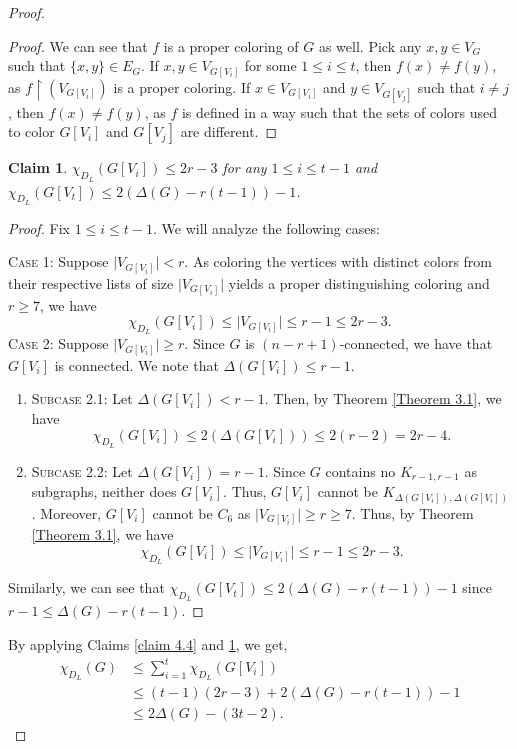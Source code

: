 \documentclass[12pt,reqno,a4paper]{amsart}
\theoremstyle{definition}
\newtheorem{claim}[defn]{Claim}
\begin{document}
\begin{proof}
\begin{proof}
We can see that $f$ is a proper coloring of $G$ as well. Pick any $x,y\in V_{G}$ such that $\{x,y\}\in E_{G}$. If $x,y\in V_{G[V_{i}]}$ for some $1\leq i\leq t$, then $f(x)\neq f(y)$, as $f\restriction (V_{G[V_{i}]})$ is a proper coloring. If $x\in V_{G[V_{i}]}$ and $y\in V_{G[V_{j}]}$ such that $i\neq j$, then $f(x)\neq f(y)$, as $f$ is defined in a way such that the sets of colors used to color $G[V_{i}]$ and $G[V_{j}]$ are different.
\end{proof} 

\begin{claim}\label{claim 4.5}
{\em $\chi_{D_{L}}(G[V_{i}])\leq 2r-3$ for any $1\leq i\leq t-1$ and $\chi_{D_{L}}(G[V_{t}])\leq 2(\Delta(G)-r(t-1))-1$.}
\end{claim}

\begin{proof}
Fix $1\leq i\leq t-1$. We will analyze the following cases: 

\noindent \textsc{Case 1:}  Suppose $\vert V_{G[V_{i}]}\vert< r$. As coloring the vertices with distinct colors from their respective lists of size $\vert V_{G[V_{i}]}\vert$ yields a proper distinguishing coloring and $r\geq 7$, we have
\[\chi_{D_{L}}(G[V_{i}])\leq \vert V_{G[V_{i}]}\vert \leq r-1\leq 2r-3.\] 
\noindent \textsc{Case 2:} Suppose $\vert V_{G[V_{i}]}\vert\geq r$. Since $G$ is $(n-r+1)$-connected, we have that $G[V_{i}]$ is connected. We note that $\Delta(G[V_{i}])\leq r-1$.
\vspace{2mm}
\begin{enumerate}
    \item[] \textsc{Subcase 2.1:} Let $\Delta(G[V_{i}])< r-1$.
Then, by Theorem \ref{Theorem 3.1}, we have
\[\chi_{D_{L}}(G[V_{i}])\leq 2(\Delta (G[V_{i}]))\leq 2(r-2)=2r-4.\]
    \item[] \textsc{Subcase 2.2:}
    Let $\Delta(G[V_{i}])= r-1$.
Since $G$ contains no $K_{r-1,r-1}$ as subgraphs, neither does $G[V_{i}]$. 
Thus, $G[V_{i}]$ cannot be $K_{\Delta(G[V_{i}]), \Delta(G[V_{i}])}$. 
Moreover, $G[V_{i}]$ cannot be $C_{6}$ as $\vert V_{G[V_{i}]}\vert\geq r\geq 7$.
Thus, by Theorem \ref{Theorem 3.1}, we have
\[\chi_{D_{L}}(G[V_{i}])\leq \vert V_{G[V_{i}]}\vert \leq r-1\leq 2r-3.\]
\end{enumerate}
Similarly, we can see that $\chi_{D_{L}}(G[V_{t}])\leq 2(\Delta(G)-r(t-1))-1$ since $r-1\leq \Delta(G)-r(t-1)$. 
\end{proof}
By applying Claims \ref{claim 4.4} and \ref{claim 4.5}, we get,
\begin{equation*}
\begin{aligned}
 \chi_{D_{L}}(G) & \leq \sum_{i=1}^{t} \chi_{D_{L}}(G[V_{i}])\\
      & \leq (t-1)(2r-3) + 2(\Delta(G)-r(t-1))-1\\
      & \leq 2\Delta(G)- (3t-2).
\end{aligned}
\end{equation*}
\end{proof}
\end{document}
